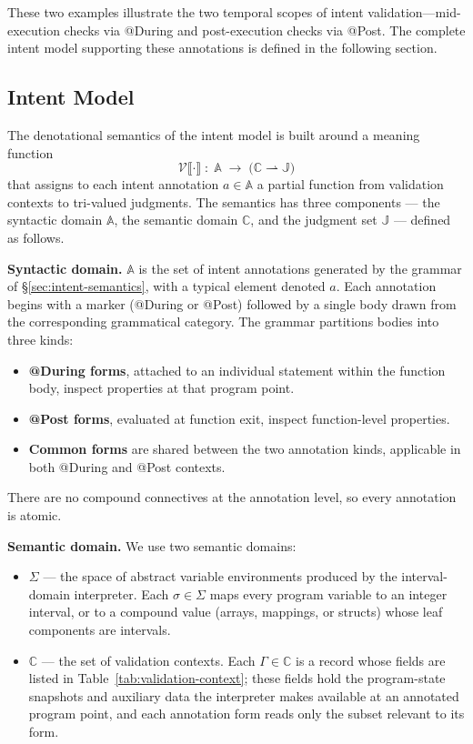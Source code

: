 \documentclass[pdflatex,sn-basic]{sn-jnl}%
\theoremstyle{thmstyleone}%
\theoremstyle{thmstyletwo}%
\theoremstyle{thmstylethree}%
\begin{document}
\smallskip
These two examples illustrate the two temporal scopes of intent validation---mid-execution checks via @During and post-execution checks via @Post.
The complete intent model supporting these annotations is defined in the following section.

\subsection{Intent Model}\label{sec:intent-model}

The denotational semantics of the intent model is built around a meaning function
\[
\mathcal{V}\llbracket \cdot \rrbracket \;\colon\; \mathbb{A} \;\to\; \bigl(\mathbb{C} \rightharpoonup \mathbb{J}\bigr)
\]
that assigns to each intent annotation $a \in \mathbb{A}$ a partial function from validation contexts to tri-valued judgments. The semantics has three components --- the syntactic domain $\mathbb{A}$, the semantic domain $\mathbb{C}$, and the judgment set $\mathbb{J}$ --- defined as follows.

\smallskip
\noindent\textbf{Syntactic domain.}
$\mathbb{A}$ is the set of intent annotations generated by the grammar of §\ref{sec:intent-semantics}, with a typical element denoted $a$.
Each annotation begins with a marker (@During or @Post) followed by a single body drawn from the corresponding grammatical category.
The grammar partitions bodies into three kinds:
\begin{itemize}
    \item \textbf{@During forms}, attached to an individual statement within the function body, inspect properties at that program point.
    \item \textbf{@Post forms}, evaluated at function exit, inspect function-level properties.
    \item \textbf{Common forms} are shared between the two annotation kinds, applicable in both @During and @Post contexts.
\end{itemize}
There are no compound connectives at the annotation level, so every annotation is atomic.

\smallskip
\noindent\textbf{Semantic domain.}
We use two semantic domains:
\begin{itemize}
    \item $\Sigma$ --- the space of abstract variable environments produced by the interval-domain interpreter. Each $\sigma \in \Sigma$ maps every program variable to an integer interval, or to a compound value (arrays, mappings, or structs) whose leaf components are intervals.
    \item $\mathbb{C}$ --- the set of validation contexts. Each $\Gamma \in \mathbb{C}$ is a record whose fields are listed in Table~\ref{tab:validation-context}; these fields hold the program-state snapshots and auxiliary data the interpreter makes available at an annotated program point, and each annotation form reads only the subset relevant to its form.
\end{itemize}
\end{document}
